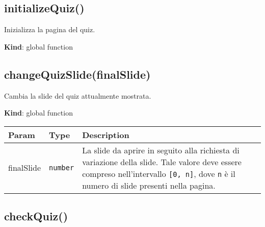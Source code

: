 \protect\hypertarget{initializeQuiz}{}{}

\hypertarget{initializequiz}{%
\subsection{initializeQuiz()}\label{initializequiz}}

Inizializza la pagina del quiz.

\textbf{Kind}: global function\\
\protect\hypertarget{changeQuizSlide}{}{}

\hypertarget{changequizslidefinalslide}{%
\subsection{changeQuizSlide(finalSlide)}\label{changequizslidefinalslide}}

Cambia la slide del quiz attualmente mostrata.

\textbf{Kind}: global function

\begin{tabularx}{\textwidth}{XXX}
\toprule
\begin{minipage}[b]{0.30\columnwidth}\raggedright
Param\strut
\end{minipage} & \begin{minipage}[b]{0.30\columnwidth}\raggedright
Type\strut
\end{minipage} & \begin{minipage}[b]{0.30\columnwidth}\raggedright
Description\strut
\end{minipage}\tabularnewline
\midrule
\endhead
\begin{minipage}[t]{0.30\columnwidth}\raggedright
finalSlide\strut
\end{minipage} & \begin{minipage}[t]{0.30\columnwidth}\raggedright
\texttt{number}\strut
\end{minipage} & \begin{minipage}[t]{0.30\columnwidth}\raggedright
La slide da aprire in seguito alla richiesta di variazione della slide.
Tale valore deve essere compreso nell'intervallo \texttt{{[}0,\ n{]}},
dove \texttt{n} è il numero di slide presenti nella pagina.\strut
\end{minipage}\tabularnewline
\bottomrule
\end{tabularx}

\protect\hypertarget{checkQuiz}{}{}

\hypertarget{checkquiz}{%
\subsection{checkQuiz()}\label{checkquiz}}

